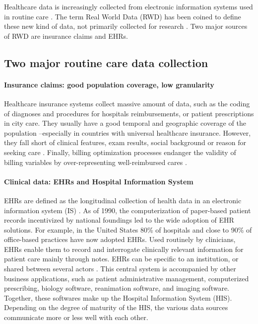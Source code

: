 \documentclass[french,12pt,twoside,a4paper]{book}
\begin{document}
\begin{background_box_left}
  Healthcare data is increasingly collected from electronic information systems
  used in routine care
  \citep{jha_use_2009,sheikh_adoption_2014,kim_rate_2017,esdar_diffusion_2019,kanakubo_comparing_2019,liang_adoption_2021,apathy_decade_2021}.
  The term Real World Data (RWD) has been coined to define these new kind of
  data, not primarily collected for research
  \citep{fda_real-world_2021,has_real-world_2021,kent_nice_2022}. Two major
  sources of RWD are insurance claims and EHRs.

  \subsection{Two major routine care data collection}\label{subsec:intro:routine_data}
  \paragraph{Insurance claims: good population coverage, low granularity}%
  \label{def:claims}%

  Healthcare insurance systems collect massive amount of data, such as the
  coding of diagnoses and procedures for hospitals reimbursements, or patient
  prescriptions in city care. They usually have a good temporal and geographic
  coverage of the population --especially in countries with universal healthcare
  insurance. However, they fall short of clinical features, exam results, social
  background or reason for seeking care \citep{ziegler2022high}. Finally,
  billing optimization processes endanger the validity of billing variables by
  over-representing well-reimbursed cares \citep{juven2013codage}.

  \paragraph{Clinical data: EHRs and Hospital Information System}\label{def:ehr_his}

  EHRs are defined as the longitudinal collection of health data in an
  electronic information system (IS) \citep{gunter2005emergence}. As of 1990,
  the computerization of paper-based patient records incentivized by national
  foundings led to the wide adoption of EHR solutions. For example, in the
  United States 80\% of hospitals \citep{adler2017electronic} and close to 90\%
  of office-based practices \citep{office_adoption_2023} have now adopted EHRs.
  Used routinely by clinicians, EHRs enable them to record and interrogate
  clinically relevant information for patient care mainly through notes. EHRs
  can be specific to an institution, or shared between several actors
  \citep{hoerbst2010electronic}. This central system is accompanied by other
  business applications, such as patient administrative management, computerized
  prescribing, biology software, reanimation software, and imaging software.
  Together, these softwares make up the Hospital Information System (HIS).
  Depending on the degree of maturity of the HIS, the various data sources
  communicate more or less well with each other.


\end{background_box_left}
\end{document}

